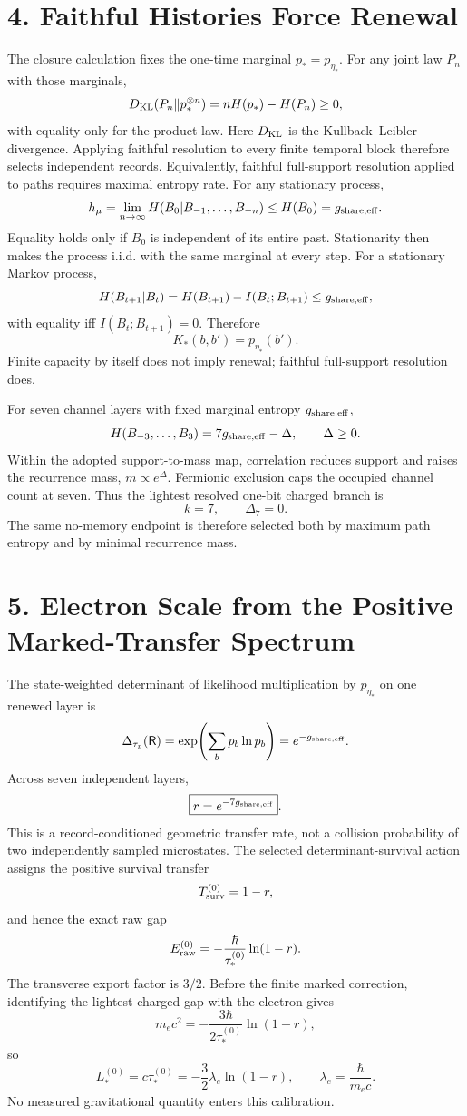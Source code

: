 \documentclass[11pt]{article}
\begin{document}
\section{4. Faithful Histories Force Renewal}

The closure calculation fixes the one-time marginal $p_*=p_{\eta_*}$. For any joint law $P_n$ with those marginals,
\[
D_{\rm KL}(P_n\Vert p_*^{\otimes n})=nH(p_*)-H(P_n)\ge0,
\]
with equality only for the product law. Here $D_{\rm KL}$ is the Kullback--Leibler divergence. Applying faithful resolution to every finite temporal block therefore selects independent records. Equivalently, faithful full-support resolution applied to paths requires maximal entropy rate. For any stationary process,
\[
h_\mu
=\lim_{n\to\infty}H(B_0|B_{-1},\ldots,B_{-n})
\le H(B_0)=g_{\rm share,eff}.
\]
Equality holds only if $B_0$ is independent of its entire past. Stationarity then makes the process i.i.d. with the same marginal at every step. For a stationary Markov process,
\[
H(B_{t+1}|B_t)
=H(B_{t+1})-I(B_t;B_{t+1})
\le g_{\rm share,eff},
\]
with equality iff $I(B_t;B_{t+1})=0$. Therefore
\[
\boxed{K_*(b,b')=p_{\eta_*}(b')}.
\]
Finite capacity by itself does not imply renewal; faithful full-support resolution does.

For seven channel layers with fixed marginal entropy $g_{\rm share,eff}$,
\[
H(B_{-3},\ldots,B_3)
=7g_{\rm share,eff}-\Delta,
\qquad \Delta\ge0.
\]
Within the adopted support-to-mass map, correlation reduces support and raises the recurrence mass, $m\propto e^\Delta$. Fermionic exclusion caps the occupied channel count at seven. Thus the lightest resolved one-bit charged branch is
\[
\boxed{k=7,\qquad\Delta_7=0}.
\]
The same no-memory endpoint is therefore selected both by maximum path entropy and by minimal recurrence mass.

\section{5. Electron Scale from the Positive Marked-Transfer Spectrum}

The state-weighted determinant of likelihood multiplication by $p_{\eta_*}$ on one renewed layer is
\[
\Delta_{\tau_p}(\mathsf R)
=\exp\!\left(\sum_b p_b\ln p_b\right)
=e^{-g_{\rm share,eff}}.
\]
Across seven independent layers,
\[
\boxed{r=e^{-7g_{\rm share,eff}}}.
\]
This is a record-conditioned geometric transfer rate, not a collision probability of two independently sampled microstates. The selected determinant-survival action assigns the positive survival transfer
\[
T_{\rm surv}^{(0)}=1-r,
\]
and hence the exact raw gap
\[
E_{\rm raw}^{(0)}
=-\frac{\hbar}{\tau_*^{(0)}}\ln(1-r).
\]
The transverse export factor is $3/2$. Before the finite marked correction, identifying the lightest charged gap with the electron gives
\[
m_ec^2
=-\frac{3\hbar}{2\tau_*^{(0)}}\ln(1-r),
\]
so
\[
\boxed{
L_*^{(0)}=c\tau_*^{(0)}
=-\frac32\lambda_e\ln(1-r),
\qquad
\lambda_e=\frac{\hbar}{m_ec}.
}
\]
No measured gravitational quantity enters this calibration.
\end{document}
